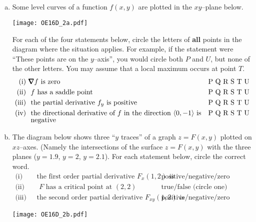 


\subsection*{\Conceptual}

\begin{question}[M200 2016D] %
\begin{enumerate}[(a)]
\item
Some level curves of a function $f(x,y)$ are plotted in the $xy$--plane 
below. 

\begin{center}
     \texttt{[image: OE16D\_2a.pdf]}
\end{center}

For each of the four statements below, circle the letters of
\textbf{all} points in the diagram where the situation applies.
For example, if the statement were ``These points are on the $y$--axis'', you would circle both $P$ and $U$, but none of the other letters.
You may assume that a local maximum occurs at point $T$. 
\begin{align*}
\text{(i) }& \vnabla f\text{ is zero} & &\text{P Q R S T U} \\
\text{(ii) }& \text{ $f$ has a saddle point} & &\text{P Q R S T U} \\
\text{(iii) }& \text{ the partial derivative $f_y$ is positive} & &\text{P Q R S T U} \\
\text{(iv) }& \text{ the directional derivative of $f$ in the 
                 direction $\llt 0,-1\rgt$ is} & &\text{P Q R S T U} \\[-0.07in]
          & \text{ negative} & & 
\end{align*}


\item
The diagram below shows three ``$y$ traces'' of a graph $z=F(x,y)$ plotted
on $xz$--axes. (Namely the intersections of the surface  $z=F(x,y)$ with the 
three planes ($y=1.9$, $y=2$, $y=2.1$). For each statement below, circle the
correct word.
\begin{align*}
\text{(i) }& \text{ the first order partial derivative $F_x(1,2)$ is} & &\text{positive/negative/zero (circle one)} \\
\text{(ii) }& \text{ $F$ has a critical point at $(2,2)$ } & 
         &\text{true/false (circle one)} \\
\text{(iii) }& \text{ the second order partial derivative $F_{xy}(1,2)$ is} & &\text{positive/negative/zero (circle one)} 
\end{align*}

\begin{center}
     \texttt{[image: OE16D\_2b.pdf]}
\end{center}
\end{enumerate}
\end{question}

